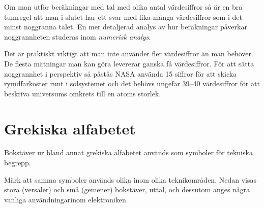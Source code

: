 Om man utför beräkningar med tal med olika antal värdesiffror så är en
bra tumregel att man i slutet har ett svar med lika många värdesiffror
som i det minst noggranna talet. En mer detaljerad analys av hur
beräkningar påverkar noggrannheten studeras inom \emph{numerisk
analys}.

Det är praktiskt viktigt att man inte använder fler värdesiffror än
man behöver.  De flesta mätningar man kan göra levererar ganska få
värdesiffror.  För att sätta noggrannhet i perspektiv så påstås NASA
använda 15 siffror för att skicka rymdfarkoster runt i solsystemet och
det behövs ungefär 39--40 värdesiffror för att beskriva universums
omkrets till en atoms storlek.




\newpage
\section{Grekiska alfabetet}

Bokstäver ur bland annat grekiska alfabetet används som symboler för
tekniska begrepp.

Märk att samma symboler används olika inom olika teknikområden. Nedan
visas stora (versaler) och små (gemener) bokstäver, uttal, och
dessutom anges några vanliga användningarinom elektroniken.

